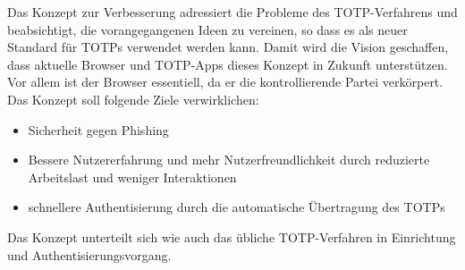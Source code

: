 Das Konzept zur Verbesserung adressiert die Probleme des TOTP-Verfahrens und 
beabsichtigt, die vorangegangenen Ideen zu vereinen, so dass es als neuer Standard für 
TOTPs verwendet werden kann.
Damit wird die Vision geschaffen, dass aktuelle Browser und 
TOTP-Apps dieses Konzept in Zukunft unterstützen. Vor allem ist der Browser  essentiell, da er die kontrollierende Partei verkörpert. Das Konzept soll folgende Ziele verwirklichen:
\begin{itemize}
    \item Sicherheit gegen Phishing
    \item Bessere Nutzererfahrung und mehr Nutzerfreundlichkeit durch reduzierte Arbeitslast und weniger Interaktionen
    \item schnellere Authentisierung durch die automatische Übertragung des TOTPs
\end{itemize}
Das Konzept unterteilt sich wie auch das übliche TOTP-Verfahren in Einrichtung und Authentisierungsvorgang.
